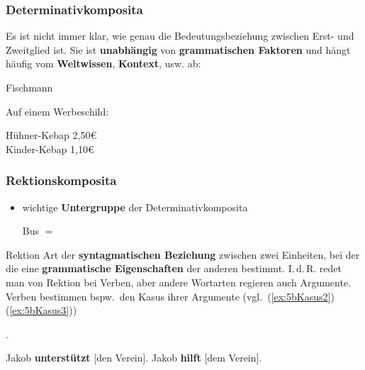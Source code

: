 \begin{frame}
\frametitle{Determinativkomposita}
	
Es ist nicht immer klar, wie genau die Bedeutungsbeziehung zwischen Erst- und Zweitglied ist. Sie ist \textbf{unabhängig} von \textbf{grammatischen Faktoren} und hängt häufig vom \textbf{Weltwissen}, \textbf{Kontext}, usw. ab:
	
\settowidth{}
	\ea Fischmann	
							\jambox{\ldots}

\pause 
		
\settowidth{}
	\ex Auf einem Werbeschild:
	
	Hühner-Kebap 2,50€\\
	Kinder-Kebap 1,10€ 
	\z
	
	
\end{frame}



\begin{frame}
\frametitle{Rektionskomposita}

\begin{itemize}
	\item wichtige \textbf{Untergruppe} der Determinativkomposita
	
	\ea Bus $=$ 
	\z 
\end{itemize}

\pause 

\begin{block}{Rektion}
	Art der \textbf{syntagmatischen Beziehung} zwischen zwei Einheiten, bei der die eine \textbf{grammatische Eigenschaften} der anderen bestimmt. I.\,d.\,R. redet man von Rektion bei Verben, aber andere Wortarten regieren auch Argumente.  Verben bestimmen bspw.\ den Kasus ihrer Argumente (vgl.\ (\ref{ex:5bKasus2}) \vs (\ref{ex:5bKasus3})) 
	
	\hfill \citep[vgl.][]{McIntyre13a, MyP16e}.

\end{block}

\ea 
	\ea\label{ex:5bKasus2} {Jakob \textbf{unterstützt} [den Verein].}
	\ex\label{ex:5bKasus3} {Jakob \textbf{hilft} [dem Verein].}
	\z
\z  

\end{frame}


